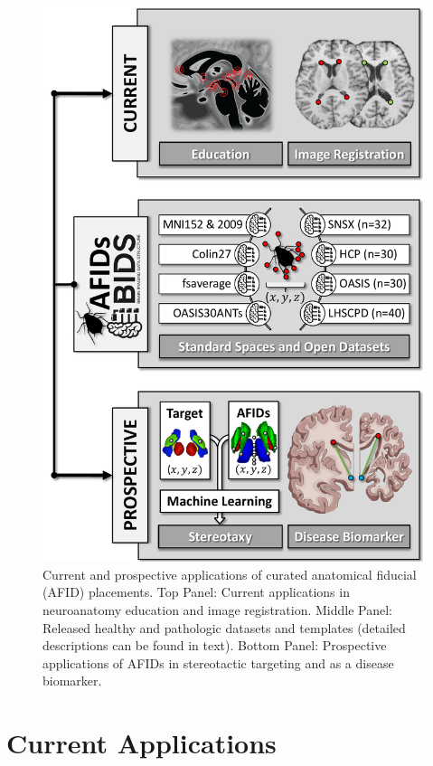 \begin{figure}[hbt!]
    \centering
    \includegraphics[width=0.85\linewidth]{figs/ch2_Figure_1.pdf}
    \caption{Current and prospective applications of curated anatomical fiducial (AFID) placements. Top Panel: Current applications in neuroanatomy education and image registration. Middle Panel: Released healthy and pathologic datasets and templates (detailed descriptions can be found in text). Bottom Panel: Prospective applications of AFIDs in stereotactic targeting and as a disease biomarker.}
    \label{fig:ch2_Figure_1}
\end{figure}


\section{Current Applications}

